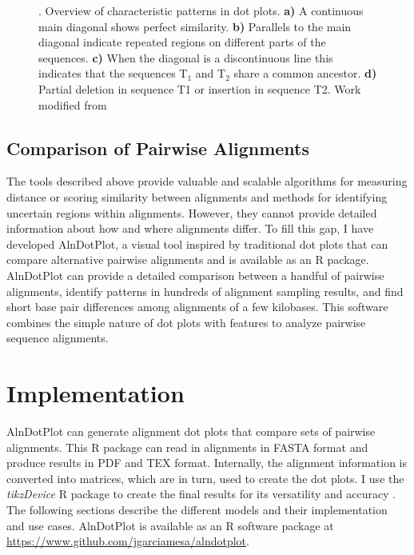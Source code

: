 \begin{figure}[!ht]
    \centering
    \scalebox{1}{}
    \caption[Overview of patterns found in dot plots]{. Overview of characteristic patterns in dot plots.
    \textbf{a)} A continuous main diagonal shows perfect similarity.
    \textbf{b)} Parallels to the main diagonal indicate repeated regions on different parts of the sequences.
    \textbf{c)} When the diagonal is a discontinuous line this indicates that the sequences T$_1$ and T$_2$ share a common ancestor.
    \textbf{d)} Partial deletion in sequence T1 or insertion in sequence T2. Work modified from \citealp{schulz2008code10}}
    \label{fig:dotplot-patterns}
\end{figure}

\subsection{Comparison of Pairwise Alignments}

The tools described above provide valuable and scalable algorithms for measuring distance or scoring similarity between alignments and methods for identifying uncertain regions within alignments. However, they cannot provide detailed information about how and where alignments differ. To fill this gap, I have developed AlnDotPlot, a visual tool inspired by traditional dot plots that can compare alternative pairwise alignments and is available as an R package. AlnDotPlot can provide a detailed comparison between a handful of pairwise alignments, identify patterns in hundreds of alignment sampling results, and find short base pair differences among alignments of a few kilobases. This software combines the simple nature of dot plots with features to analyze pairwise sequence alignments.

\section{Implementation}

AlnDotPlot can generate alignment dot plots that compare sets of pairwise alignments. This R package can read in alignments in FASTA format and produce results in PDF and TEX format. Internally, the alignment information is converted into matrices, which are in turn, used to create the dot plots. I use the \textit{tikzDevice} R package to create the final results for its versatility and accuracy \citep{sharpsteen2023tikzdevice}. The following sections describe the different models and their implementation and use cases. AlnDotPlot is available as an R software package at \url{https://www.github.com/jgarciamesa/alndotplot}.


